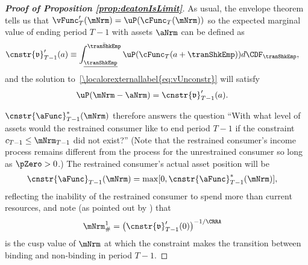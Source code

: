 \documentclass[\econtexRoot/BufferStockTheory]{subfiles}
\begin{document}
\begin{proof}[\textbf{Proof of Proposition \ref{prop:deatonIsLimit}}]
As usual, the envelope theorem tells us that $\vFunc_{T}^{\prime}(\mNrm)=\uP(\cFunc_{T}(\mNrm))$ so the expected marginal value of ending period $T-1$ with assets $\aNrm$ can be defined as
\begin{equation}\begin{gathered}\begin{aligned}
      \cnstr{\mathfrak{v}}_{T-1}^{\prime}(a)  & \equiv  \int_{\underline{\tranShkEmp}}^{\bar{\tranShkEmp}} \uP(\cFunc_{T}(a+\tranShkEmp)) d\CDF_{\tranShkEmp}, \notag
    \end{aligned}\end{gathered}\end{equation}
and the solution to~\eqref{\localorexternallabel{eq:vUnconstr}} will satisfy
\begin{equation}\begin{gathered}\begin{aligned}
      \uP(\mNrm-\aNrm)  & =  \cnstr{\mathfrak{v}}_{T-1}^{\prime}(a) \label{eq:uPConstr}.
    \end{aligned}\end{gathered}\end{equation}

$\cnstr{\aFunc}_{T-1}^{*}(\mNrm)$ therefore answers the question ``With what level of assets would the restrained consumer like to end period $T-1$ if the constraint $c_{T-1} \leq \mNrm_{T-1}$ did not exist?''  (Note that the restrained consumer's income process remains different from the process for the unrestrained consumer so long as $\pZero>0$.)  The restrained consumer's actual asset position will be
\begin{equation}\begin{gathered}\begin{aligned}
      \cnstr{\aFunc}_{T-1}(\mNrm)  & = \max[0,\cnstr{\aFunc}^{*}_{T-1}(\mNrm)], \notag
    \end{aligned}\end{gathered}\end{equation}
reflecting the inability of the restrained consumer to spend more than current resources, and note (as pointed out by \cite{deatonLiqConstr}) that
\begin{equation}\begin{gathered}\begin{aligned}
      \mNrm^{1}_{\#}  & = {\left( \cnstr{\mathfrak{v}}_{T-1}^{\prime}(0)\right)}^{-1/\CRRA} \notag
    \end{aligned}\end{gathered}\end{equation}
is the cusp value of $\mNrm$ at which the constraint makes the
transition between binding and non-binding in period $T-1$.


\end{proof}
\end{document}
